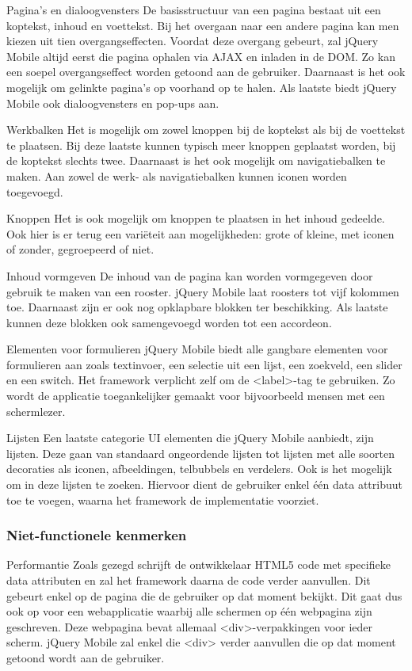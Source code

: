 Pagina's en dialoogvensters
De basisstructuur van een pagina bestaat uit een koptekst, inhoud en voettekst. Bij het overgaan naar een andere pagina kan men kiezen uit tien overgangseffecten. Voordat deze overgang gebeurt, zal jQuery Mobile altijd eerst die pagina ophalen via AJAX en inladen in de DOM. Zo kan een soepel overgangseffect worden getoond aan de gebruiker. Daarnaast is het ook mogelijk om gelinkte pagina's op voorhand op te halen. Als laatste biedt jQuery Mobile ook dialoogvensters en pop-ups aan. 

Werkbalken
Het is mogelijk om zowel knoppen bij de koptekst als bij de voettekst te plaatsen. Bij deze laatste kunnen typisch meer knoppen geplaatst worden, bij de koptekst slechts twee. Daarnaast is het ook mogelijk om navigatiebalken te maken. Aan zowel de werk- als navigatiebalken kunnen iconen worden toegevoegd.

Knoppen
Het is ook mogelijk om knoppen te plaatsen in het inhoud gedeelde. Ook hier is er terug een variëteit aan mogelijkheden: grote of kleine, met iconen of zonder, gegroepeerd of niet. 

Inhoud vormgeven
De inhoud van de pagina kan worden vormgegeven door gebruik te maken van een rooster. jQuery Mobile laat roosters tot vijf kolommen toe. Daarnaast zijn er ook nog opklapbare blokken ter beschikking. Als laatste kunnen deze blokken ook samengevoegd worden tot een accordeon. 

Elementen voor formulieren
jQuery Mobile biedt alle gangbare elementen voor formulieren aan zoals textinvoer, een selectie uit een lijst, een zoekveld, een slider en een switch. Het framework verplicht zelf om de <label>-tag te gebruiken. Zo wordt de applicatie toegankelijker gemaakt voor bijvoorbeeld mensen met een schermlezer.

Lijsten
Een laatste categorie UI elementen die jQuery Mobile aanbiedt, zijn lijsten. Deze gaan van standaard ongeordende lijsten tot lijsten met alle soorten decoraties als iconen, afbeeldingen, telbubbels en verdelers. Ook is het mogelijk om in deze lijsten te zoeken. Hiervoor dient de gebruiker enkel één data attribuut toe te voegen, waarna het framework de implementatie voorziet. 

\subsubsection{Niet-functionele kenmerken}
Performantie
Zoals gezegd schrijft de ontwikkelaar HTML5 code met specifieke data attributen en zal het framework daarna de code verder aanvullen. Dit gebeurt enkel op de pagina die de gebruiker op dat moment bekijkt. Dit gaat dus ook op voor een webapplicatie waarbij alle schermen op één webpagina zijn geschreven. Deze webpagina bevat allemaal <div>-verpakkingen voor ieder scherm. jQuery Mobile zal enkel die <div> verder aanvullen die op dat moment getoond wordt aan de gebruiker. 

